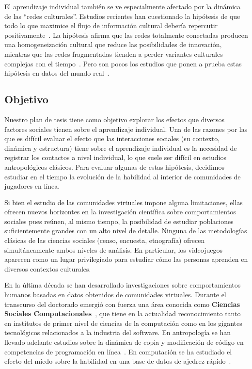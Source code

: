 \documentclass[a4paper,11pt]{book}
\theoremstyle{definition}
\begin{document}

El aprendizaje individual tambi\'en se ve especialmente afectado por la din\'amica de las ``redes culturales''.
%
Estudios recientes han cuestionado la hip\'otesis de que todo lo que maximice el flujo de informaci\'on cultural deber\'ia repercutir positivamente~\cite{Derex2020}.
%
La hip\'otesis afirma que las redes totalmente conectadas producen una homogeneizaci\'on cultural que reduce las posibilidades de innovaci\'on, mientras que las redes fragmentadas tienden a perder variantes culturales complejas con el tiempo~\cite{padilla2022-interconnectivity,derex2018-divideAndConquer,Creanza2017}.
%
Pero son pocos los estudios que ponen a prueba estas hip\'otesis en datos del mundo real~\cite{migliano2017-hunterGathererNetwork, Derex2020}.



\subsection{Objetivo}

Nuestro plan de tesis tiene como objetivo explorar los efectos que diversos factores sociales tienen sobre el aprendizaje individual.
%
Una de las razones por las que es dif\'icil evaluar el efecto que las interacciones sociales (su contexto, din\'amica y estructura) tiene sobre el aprendizaje individual es la necesidad de registrar los contactos a nivel individual, lo que suele ser dif\'icil en estudios antropol\'ogicos cl\'asicos.
%
Para evaluar algunas de estas hip\'otesis, decidimos estudiar en el tiempo la evoluci\'on de la habilidad al interior de comunidades de jugadores en l\'inea.


Si bien el estudio de las comunidades virtuales impone alguna limitaciones, ellas ofrecen nuevos horizontes en la investigaci\'on cient\'ifica sobre comportamientos sociales pues re\'unen, al mismo tiempo, la posibilidad de estudiar poblaciones suficientemente grandes con un alto nivel de detalle.
%
Ninguna de las metodolog\'ias cl\'asicas de las ciencias sociales (censo, encuesta, etnograf\'ia) ofrecen simult\'aneamente ambos niveles de an\'alisis.
%
En particular, los videojuegos aparecen como un lugar privilegiado para estudiar c\'omo las personas aprenden en diversos contextos culturales.


En la \'ultima d\'ecada se han desarrollado investigaciones sobre comportamientos humanos basadas en datos obtenidos de comunidades virtuales.
%
Durante el transcurso del doctorado emergi\'o con fuerza una \'area conocida como \textbf{Ciencias Sociales Computacionales}~\cite{Lazer2009,Lazer2020}, que tiene en la actualidad reconocimiento tanto en institutos de primer nivel de ciencias de la computaci\'on como en los gigantes tecnol\'ogicos relacionados a la industria del software.
%
En antropolog\'ia se han llevado adelante estudios sobre la din\'amica de copia y modificaci\'on de c\'odigo en competencias de programaci\'on en l\'inea~\cite{miu2018-cumulativeCultureOnlineProgrammingContests}.
%
En computaci\'on se ha estudiado el efecto del miedo sobre la habilidad en una base de datos de ajedrez r\'apido~\cite{slezak2012-doNotFearYourOpponent}.
\end{document}
